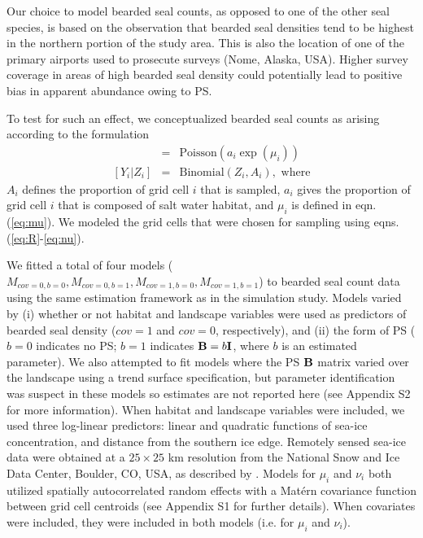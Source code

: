 \documentclass[times,mee,doublespace,]{besauth2}
\begin{document}
Our choice to model bearded seal counts, as opposed to one of the other seal species, is based on the observation that bearded seal densities tend to be highest in the northern portion of the study area. This is also the location of one of the primary airports used to prosecute surveys (Nome, Alaska, USA).  Higher survey coverage in areas of high bearded seal density could potentially lead to positive bias in apparent abundance owing to PS.

To test for such an effect, we conceptualized bearded seal counts as arising according to the formulation
\begin{eqnarray*}
  [Z_i | \mu_i] & = & \textrm{Poisson}(a_i \exp(\mu_i)) \\
  [Y_i|Z_i] & = & \textrm{Binomial}(Z_i, A_i), \text{ where}
\end{eqnarray*}
$A_i$ defines the proportion of grid cell $i$ that is sampled, $a_i$ gives the proportion of grid cell $i$ that is composed of salt water habitat, and $\mu_i$ is defined in eqn. (\ref{eq:mu}).
We modeled the grid cells that were chosen for sampling using eqns. (\ref{eq:R}-\ref{eq:nu}).

We fitted a total of four models ($M_{cov=0,b=0},M_{cov=0,b=1},M_{cov=1,b=0},M_{cov=1,b=1}$) to bearded seal count data using the same estimation framework as in the simulation study.  Models varied by (i) whether or not habitat and landscape variables were used as predictors of bearded seal density ($cov=1$ and $cov=0$, respectively), and (ii) the form of PS ($b=0$ indicates no PS; $b=1$ indicates ${\bf B}=b{\bf I}$, where $b$ is an estimated parameter).  We also attempted to fit models where the PS ${\bf B}$ matrix varied over the landscape using a trend surface specification, but parameter identification was suspect in these models so estimates are not reported here (see Appendix S2 for more information).  When habitat and landscape variables were included, we used three log-linear predictors: linear and quadratic functions of sea-ice concentration, and distance from the southern ice edge.  Remotely sensed sea-ice data were obtained at a $25 \times 25$ km resolution from the National Snow and Ice Data Center, Boulder, CO, USA, as described by \citet{ConnEtAl2014}.  Models for $\mu_i$ and $\nu_i$ both utilized spatially autocorrelated random effects with a Mat\'{e}rn covariance function between grid cell centroids (see Appendix S1 for further details).  When covariates were included, they were included in both models (i.e. for $\mu_i$ and $\nu_i$).
\end{document}
